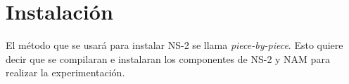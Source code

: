 \section*{Instalaci\'on}

\noindent El m\'etodo que se usar\'a para instalar NS-2 se llama \textit{piece-by-piece}. Esto quiere decir que se compilaran
e instalaran los componentes de NS-2 y NAM para realizar la experimentaci\'on.  